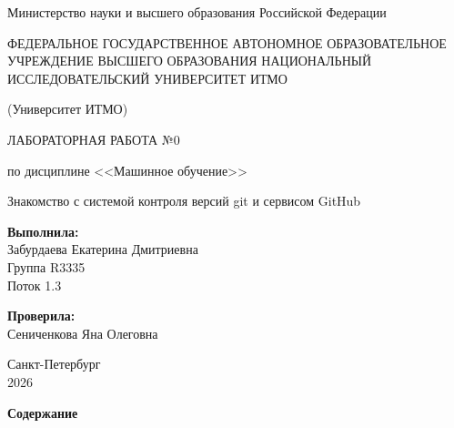 \documentclass[a4paper, 12pt]{article}
\begin{document}
\begin{titlepage}
    \begin{center}
        Министерство науки и высшего образования Российской Федерации
        
        \vspace{0.7cm}
        ФЕДЕРАЛЬНОЕ ГОСУДАРСТВЕННОЕ АВТОНОМНОЕ ОБРАЗОВАТЕЛЬНОЕ УЧРЕЖДЕНИЕ ВЫСШЕГО ОБРАЗОВАНИЯ
        НАЦИОНАЛЬНЫЙ ИССЛЕДОВАТЕЛЬСКИЙ УНИВЕРСИТЕТ ИТМО
        
        (Университет ИТМО)
               
        \vspace{3cm}
        {ЛАБОРАТОРНАЯ РАБОТА №0}
        
        \vspace{0.3cm}
        по дисциплине <<Машинное обучение>>
        
        \vspace{0.5cm}
        {\Large Знакомство с системой контроля версий git и сервисом GitHub}
        
        \vspace{3cm}
        \begin{flushright}
            \begin{minipage}{0.48\textwidth}
                \begin{flushleft}
                    \textbf{Выполнила:} \\
                    Забурдаева Екатерина Дмитриевна \\
                    Группа R3335 \\
                    Поток 1.3
                
                    \vspace{0.5cm}
                    \textbf{Проверила:} \\
                    Сениченкова Яна Олеговна
                \end{flushleft}
            \end{minipage}
        \end{flushright}
        
        \vfill
        Санкт-Петербург \\
        2026
    \end{center}
\end{titlepage}

\newpage
\begingroup
\setcounter{page}{2}
\renewcommand{\contentsname}{}
\begin{center}
\Large\textbf{Содержание}
\end{center}
\vspace{1cm}
\tableofcontents
\endgroup
\end{document}
